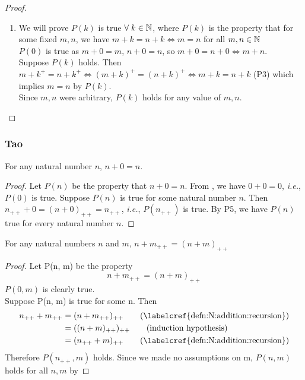 \begin{proof}
    \begin{enumerate}[label=(\alph*)]
        \item[\labelcref{thm:N:cancellation}] We will prove $P(k)$ is true $\forall\; k \in \mathbb{N}$, where $P(k)$ is the property that for some fixed $m, n$, we have $m + k = n + k \iff m = n$ for all $m, n \in \mathbb{N}$ \\
        $P(0)$ is true as $m + 0 = m$, $n + 0 = n$, so $m + 0 = n + 0 \iff m + n$. \\
        Suppose $P(k)$ holds. Then $m + k^{+} = n + k^{+} \iff (m + k)^{+} = (n + k)^{+} \iff m + k = n + k$ (P3) which implies $m = n$ by $P(k)$. \\
        Since $m, n$ were arbitrary, $P(k)$ holds for any value of $m, n$.
        \qedhere
    \end{enumerate}
\end{proof}

\subsubsection{Tao} \vskip 0.5cm
\begin{lem} \label{thm:N:Tao:zero}
For any natural number $n$, $n+0=n$.
\end{lem}

\begin{proof}
    Let $P(n)$ be the property that $n+0=n$. From , we have $0+0=0$, \emph{i.e.}, $P(0)$ is true. Suppose $P(n)$ is true for some natural number $n$. Then $n_{++}+0=(n+0)_{++}=n_{++}$, \emph{i.e.}, $P(n_{++})$ is true. By P5, we have $P(n)$ true for every natural number $n$.
\end{proof}

\begin{lem} \label{thm:N:Tao:recursion}
For any natural numbers $n$ and $m$, $n+m_{++}=(n+m)_{++}$
\end{lem}

\begin{proof}
    Let P(n, m) be the property
    \begin{equation*}
        n+m_{++}=(n+m)_{++}
    \end{equation*}
    $P(0, m)$ is clearly true. \\
    Suppose P(n, m) is true for some n. Then
    \begin{align*}
        n_{++}+m_{++} &= (n + m_{++})_{++}  \tag{\labelcref{defn:N:addition:recursion}} \\
                      &= ((n+m)_{++})_{++}  \tag{induction hypothesis} \\
                      &= (n_{++}+m)_{++}    \tag{\labelcref{defn:N:addition:recursion}}
    \end{align*}
    Therefore $P(n_{++}, m)$ holds. Since we made no assumptions on m, $P(n, m)$ holds for all $n, m$ by 
\end{proof}

